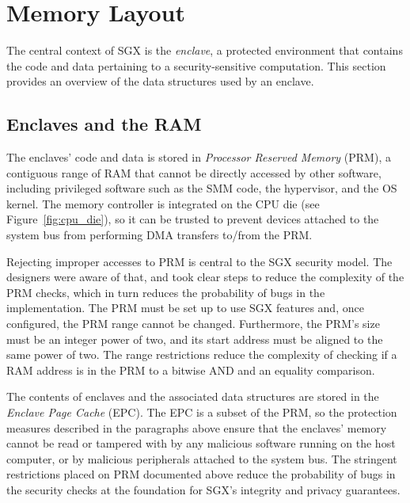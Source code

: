 \section{Memory Layout}
\label{sec:enclaves}

The central context of SGX is the \textit{enclave}, a protected environment
that contains the code and data pertaining to a security-sensitive computation.
This section provides an overview of the data structures used by an enclave.


\subsection{Enclaves and the RAM}


The enclaves' code and data is stored in \textit{Processor Reserved Memory}
(PRM), a contiguous range of RAM that cannot be directly accessed by other
software, including privileged software such as the SMM code, the hypervisor,
and the OS kernel. The memory controller is integrated on the CPU die (see
Figure~\ref{fig:cpu_die}), so it can be trusted to prevent devices attached to
the system bus from performing DMA transfers to/from the PRM.

Rejecting improper accesses to PRM is central to the SGX security model. The
designers were aware of that, and took clear steps to reduce the complexity of
the PRM checks, which in turn reduces the probability of bugs in the
implementation. The PRM must be set up to use SGX features and, once
configured, the PRM range cannot be changed. Furthermore, the PRM's size must
be an integer power of two, and its start address must be aligned to the same
power of two. The range restrictions reduce the complexity of checking if a RAM
address is in the PRM to a bitwise AND and an equality comparison.


The contents of enclaves and the associated data structures are stored in the
\textit{Enclave Page Cache} (EPC). The EPC is a subset of the PRM, so the
protection measures described in the paragraphs above ensure that the enclaves'
memory cannot be read or tampered with by any malicious software running on the
host computer, or by malicious peripherals attached to the system bus. The
stringent restrictions placed on PRM documented above reduce the probability of
bugs in the security checks at the foundation for SGX's integrity and privacy
guarantees.

